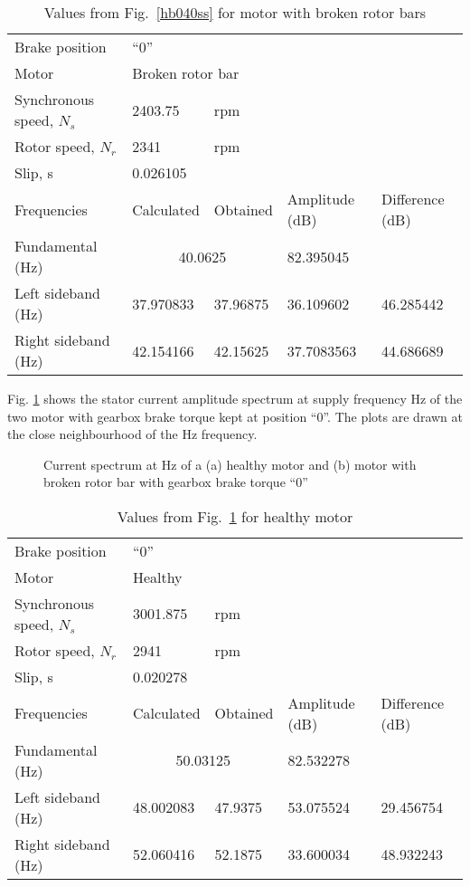 \documentclass[a4paper,11pt]{report}
\begin{document}
\begin{table}[h]
\centering
\begin{tabular}{lllll}
Brake position	& ``0'' & & & \\			
Motor &	\multicolumn{4}{l}{Broken rotor	bar} \\ 
Synchronous speed, $N_{s}$	&  2403.75		& rpm & & \\			
Rotor speed, $N_{r}$ 	  	& 2341		& rpm& & \\		
Slip, s			  	& \multicolumn{4}{l}{0.026105} \\			
Frequencies 		  	& Calculated & Obtained & Amplitude (dB) & Difference (dB) \\
Fundamental (Hz)		& \multicolumn{2}{c}{40.0625}	&82.395045 	&  \\ 
Left sideband (Hz) 		& 37.970833 & 37.96875  & 36.109602 & 46.285442 \\
Right sideband (Hz)		& 42.154166 & 42.15625 & 37.7083563 & 44.686689 
\end{tabular}
\caption{Values from Fig.~\ref{hb040ss} for motor with broken rotor bars} \label{b040sst}
\end{table}

\clearpage
Fig. \ref{hb050ss} shows the stator current amplitude spectrum at supply frequency \unit[50]{Hz} of the two motor with gearbox brake torque kept at position ``0''. The plots are drawn at the close neighbourhood of the \unit[50]{Hz} frequency.

\begin{figure}[htbp]
\centering
\subfigure[]{\texttt{[image: h050]}}
\subfigure[]{\texttt{[image: b050]}}
\caption{Current spectrum at \unit[50]{Hz} of a (a) healthy motor and (b) motor with broken rotor bar with gearbox brake torque ``0''} \label{hb050ss}
\end{figure}

\begin{table}[h]
\centering
\begin{tabular}{lllll}
Brake position	& ``0'' & & & \\			
Motor &	\multicolumn{4}{l}{Healthy} \\ 
Synchronous speed, $N_{s}$	& 3001.875& rpm & & \\			
Rotor speed, $N_{r}$ 	  	& 2941	& rpm& & \\		
Slip, s			  	& \multicolumn{4}{l}{0.020278} \\			
Frequencies 		  	& Calculated & Obtained & Amplitude (dB) & Difference (dB) \\
Fundamental (Hz)		& \multicolumn{2}{c}{50.03125}	& 82.532278	&  \\ 
Left sideband (Hz) 		& 48.002083 & 47.9375 & 53.075524 & 29.456754 \\
Right sideband (Hz)		& 52.060416 & 52.1875 & 33.600034 & 48.932243 
\end{tabular}
\caption{Values from Fig.~\ref{hb050ss} for healthy motor} \label{h050sst}
\end{table}
\end{document}

